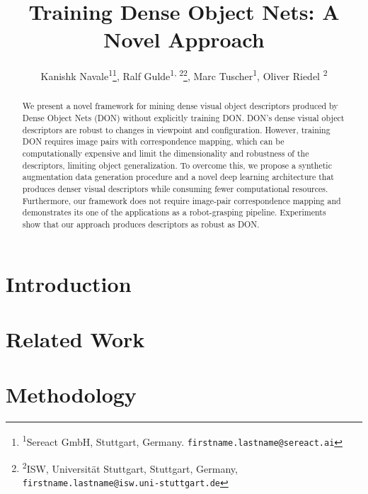 \documentclass[english]{article}
\title{Training Dense Object Nets: A Novel Approach}
\author{%
  Kanishk Navale\textsuperscript{1}\thanks{\textsuperscript{1}Sereact GmbH, Stuttgart, Germany. \texttt{firstname.lastname@sereact.ai}}, 
  Ralf Gulde\textsuperscript{1, 2}\thanks{\textsuperscript{2}ISW, Universität Stuttgart, Stuttgart, Germany,  \texttt{firstname.lastname@isw.uni-stuttgart.de}}, 
  Marc Tuscher\textsuperscript{1}, 
  Oliver Riedel \textsuperscript{2}
}
\begin{document}
\maketitle

\begin{abstract}
  We present a novel framework for mining dense visual object descriptors produced by Dense Object Nets (DON) without 
  explicitly training DON. DON's dense visual object descriptors are robust to changes in viewpoint and configuration.
  However, training DON requires image pairs with correspondence mapping, which can be computationally expensive and 
  limit the dimensionality and robustness of the descriptors, limiting object generalization. 
  To overcome this, we propose a synthetic augmentation data generation procedure and a novel deep 
  learning architecture that produces denser visual descriptors while consuming fewer computational resources. 
  Furthermore, our framework does not require image-pair correspondence mapping and demonstrates its one of the applications 
  as a robot-grasping pipeline. Experiments show that our approach produces descriptors as robust as DON.
\end{abstract}

\section{Introduction}


\section{Related Work}


\section{Methodology}


\printbibliography
\end{document}
